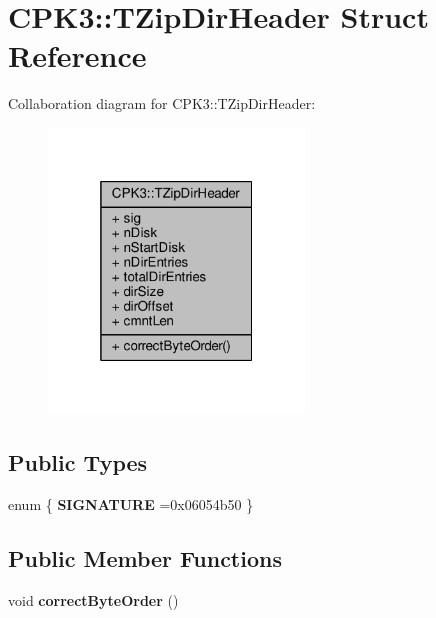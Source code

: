 \hypertarget{structCPK3_1_1TZipDirHeader}{}\section{C\+P\+K3\+:\+:T\+Zip\+Dir\+Header Struct Reference}
\label{structCPK3_1_1TZipDirHeader}


Collaboration diagram for C\+P\+K3\+:\+:T\+Zip\+Dir\+Header\+:
\nopagebreak
\begin{figure}[H]
\begin{center}
\leavevmode
\includegraphics[width=193pt]{dd/d7c/structCPK3_1_1TZipDirHeader__coll__graph}
\end{center}
\end{figure}
\subsection*{Public Types}
\begin{DoxyCompactItemize}
\item 
enum \{ {\bfseries S\+I\+G\+N\+A\+T\+U\+RE} =0x06054b50
 \}\hypertarget{structCPK3_1_1TZipDirHeader_acc0492fc4bf5ed6e4d59e44e0137632c}{}\label{structCPK3_1_1TZipDirHeader_acc0492fc4bf5ed6e4d59e44e0137632c}

\end{DoxyCompactItemize}
\subsection*{Public Member Functions}
\begin{DoxyCompactItemize}
\item 
void {\bfseries correct\+Byte\+Order} ()\hypertarget{structCPK3_1_1TZipDirHeader_ae0c6fd30d6eca896849ad8ff86731513}{}\label{structCPK3_1_1TZipDirHeader_ae0c6fd30d6eca896849ad8ff86731513}

\end{DoxyCompactItemize}
